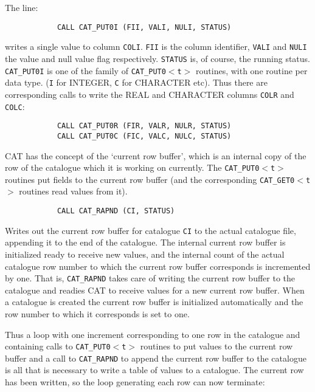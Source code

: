 The line:

\begin{verbatim}
            CALL CAT_PUT0I (FII, VALI, NULI, STATUS)
\end{verbatim}

writes a single value to column {\tt COLI}. {\tt FII} is the column
identifier, {\tt VALI} and {\tt NULI} the value and null value flag
respectively. {\tt STATUS} is, of course, the running status. {\tt
CAT\_PUT0I} is one of the family of {\tt CAT\_PUT0$<$t$>$} routines,
with one routine per data type. ({\tt I} for INTEGER, {\tt C} for
CHARACTER etc). Thus there are corresponding calls to write the REAL and
CHARACTER columns {\tt COLR} and {\tt COLC}:

\begin{verbatim}
            CALL CAT_PUT0R (FIR, VALR, NULR, STATUS)
            CALL CAT_PUT0C (FIC, VALC, NULC, STATUS)
\end{verbatim}

CAT has the concept of the `current row buffer', which is an internal
copy of the row of the catalogue which it is working on currently. The
{\tt CAT\_PUT0$<$t$>$} routines put fields to the current row buffer
(and the corresponding {\tt CAT\_GET0$<$t$>$} routines read values from
it).

\begin{verbatim}
            CALL CAT_RAPND (CI, STATUS)
\end{verbatim}

Writes out the current row buffer for catalogue {\tt CI} to the actual
catalogue file, appending it to the end of the catalogue. The internal
current row buffer is initialized ready to receive new values, and the
internal count of the actual catalogue row number to which the current
row buffer corresponds is incremented by one. That is, {\tt CAT\_RAPND}
takes care of writing the current row buffer to the catalogue and
readies CAT to receive values for a new current row buffer. When a
catalogue is created the current row buffer is initialized automatically
and the row number to which it corresponds is set to one.

Thus a loop with one increment corresponding to one row in the
catalogue and containing calls to {\tt CAT\_PUT0$<$t$>$} routines to put
values to the current row buffer and a call to {\tt CAT\_RAPND} to
append the current row buffer to the catalogue is all that is necessary
to write a table of values to a catalogue. The current row has been
written, so the loop generating each row can now terminate:

